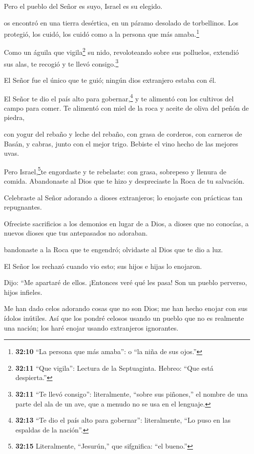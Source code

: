  Pero el pueblo del Señor es suyo, Israel es su elegido.

 os encontró en una tierra desértica, en un páramo desolado
de torbellinos. Los protegió, los cuidó, los cuidó como a la persona que
más amaba.\footnote{\textbf{32:10} ``La persona que más amaba'': o ``la
  niña de sus ojos.''}

 Como un águila que vigila\footnote{\textbf{32:11} ``Que
  vigila'': Lectura de la Septuaginta. Hebreo: ``Que está despierta.''}
su nido, revoloteando sobre sus polluelos, extendió sus alas, te recogió
y te llevó consigo.\footnote{\textbf{32:11} ``Te llevó consigo'':
  literalmente, ``sobre sus piñones,'' el nombre de una parte del ala de
  un ave, que a menudo no se usa en el lenguaje.}

 El Señor fue el único que te guió; ningún dios extranjero
estaba con él.

 El Señor te dio el país alto para gobernar,\footnote{\textbf{32:13}
  ``Te dio el país alto para gobernar'': literalmente, ``Lo puso en las
  espaldas de la nación''.} y te alimentó con los cultivos del campo
para comer. Te alimentó con miel de la roca y aceite de oliva del peñón
de piedra,

 con yogur del rebaño y leche del rebaño, con grasa de
corderos, con carneros de Basán, y cabras, junto con el mejor trigo.
Bebiste el vino hecho de las mejores uvas.

 Pero Israel,\footnote{\textbf{32:15} Literalmente,
  ``Jesurún,'' que sifgnifica: ``el bueno.''}te engordaste y te
rebelaste: con grasa, sobrepeso y llenura de comida. Abandonaste al Dios
que te hizo y despreciaste la Roca de tu salvación.

 Celebraste al Señor adorando a dioses extranjeros; lo
enojaste con prácticas tan repugnantes.

 Ofreciste sacrificios a los demonios en lugar de a Dios, a
dioses que no conocías, a nuevos dioses que tus antepasados no adoraban.

 bandonaste a la Roca que te engendró; olvidaste al Dios
que te dio a luz.

 El Señor los rechazó cuando vio esto; sus hijos e hijas lo
enojaron.

 Dijo: ``Me apartaré de ellos. ¡Entonces veré qué les pasa!
Son un pueblo perverso, hijos infieles.

 Me han dado celos adorando cosas que no son Dios; me han
hecho enojar con sus ídolos inútiles. Así que los pondré celosos usando
un pueblo que no es realmente una nación; los haré enojar usando
extranjeros ignorantes.

